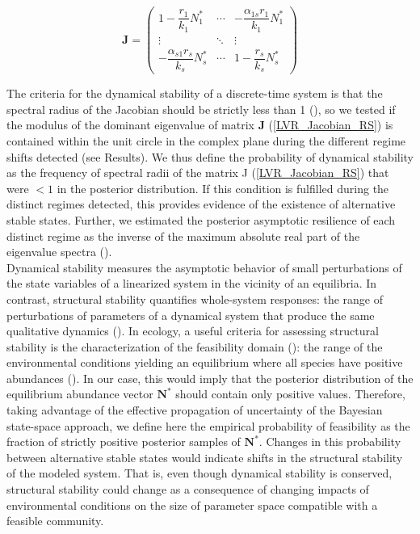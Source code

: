 \documentclass[12pt]{article}
\begin{document}
\begin{equation}\label{LVR_Jacobian_RS}
	\textbf{J} = 
	\begin{pmatrix}
		1 - \dfrac{r_{1}}{k_{1}}{N}_{1}^* & \cdots & - \dfrac{\alpha_{1s}r_{1}}{k_{1}}{N}_{1}^*\\
		\vdots & \ddots & \vdots\\
		- \dfrac{\alpha_{s1}r_{s}}{k_{s}}{N}_{s}^* & \cdots & 1 - \dfrac{r_{s}}{k_{s}}{N}_{s}^*
	\end{pmatrix}
\end{equation}

The criteria for the dynamical stability of a discrete-time system is that the spectral radius of the Jacobian should be strictly less than 1 (\cite{Elaydi2005}), so we tested if the modulus of the dominant eigenvalue of matrix \textbf{J} (\ref{LVR_Jacobian_RS}) is contained within the unit circle in the complex plane during the different regime shifts detected (see Results). We thus define the probability of dynamical stability as the frequency of spectral radii of the matrix J (\ref{LVR_Jacobian_RS}) that were $ < 1 $ in the posterior distribution. If this condition is fulfilled during the distinct regimes detected, this provides evidence of the existence of alternative stable states. Further, we estimated the posterior asymptotic resilience of each distinct regime as the inverse of the maximum absolute real part of the eigenvalue spectra (\cite{Arnoldi2016a}). \\

Dynamical stability measures the asymptotic behavior of small perturbations of the state variables of a linearized system in the vicinity of an equilibria. In contrast, structural stability quantifies whole-system responses: the range of perturbations of parameters of a dynamical system that produce the same qualitative dynamics (\cite{Thom1977,Almaraz2023b}). In ecology, a useful criteria for assessing structural stability is the characterization of the feasibility domain (\cite{Logofet1993,Roberts1974}): the range of the environmental conditions yielding an equilibrium where all species have positive abundances (\cite{Song2017b}). In our case, this would imply that the posterior distribution of the equilibrium abundance vector $\mathbf{N}^*$ should contain only positive values. Therefore, taking advantage of the effective propagation of uncertainty of the Bayesian state-space approach, we define here the empirical probability of feasibility as the fraction of strictly positive posterior samples of $\mathbf{N}^*$. Changes in this probability between alternative stable states would indicate shifts in the structural stability of the modeled system. That is, even though dynamical stability is conserved, structural stability could change as a consequence of changing impacts of environmental conditions on the size of parameter space compatible with a feasible community.\\
\end{document}
